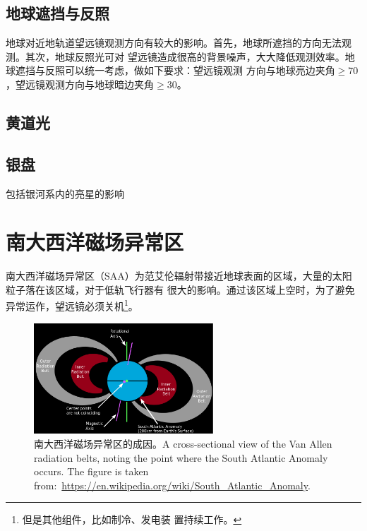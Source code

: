 \subsection{地球遮挡与反照}
地球对近地轨道望远镜观测方向有较大的影响。首先，地球所遮挡的方向无法观测。其次，地球反照光可对
望远镜造成很高的背景噪声，大大降低观测效率。地球遮挡与反照可以统一考虑，做如下要求：望远镜观测
方向与地球亮边夹角$\ge70$\textdegree，望远镜观测方向与地球暗边夹角$\ge30$\textdegree。


\subsection{黄道光}

\subsection{银盘}
包括银河系内的亮星的影响


\section{南大西洋磁场异常区}
南大西洋磁场异常区（SAA）为范艾伦辐射带接近地球表面的区域，大量的太阳粒子落在该区域，对于低轨飞行器有
很大的影响。通过该区域上空时，为了避免异常运作，望远镜必须关机\footnote{但是其他组件，比如制冷、发电装
置持续工作。}。

\begin{figure}
\centering
\includegraphics[width=0.6\textwidth,angle=0]{figs/South_Atlantic_Anomaly.png}
\caption{南大西洋磁场异常区的成因。A cross-sectional view of the Van Allen radiation belts, noting
the point where the South Atlantic Anomaly occurs. The figure is taken
from:~\url{https://en.wikipedia.org/wiki/South_Atlantic_Anomaly}.}
\label{fig:saad1}
\end{figure}

